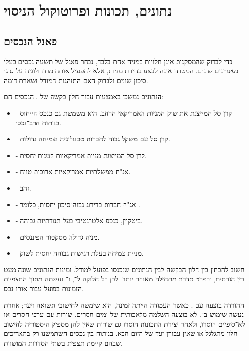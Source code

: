 \section{נתונים, תכונות ופרוטוקול הניסוי}

\subsection{פאנל הנכסים}

כדי לבדוק שהמסקנות אינן תלויות במניה אחת בלבד, נבחר פאנל של תשעה נכסים בעלי מאפיינים שונים. המטרה אינה לבצע בחירת מניות, אלא להפעיל אותה מתודולוגיה על סוגי סיכון שונים ולבדוק האם התנהגות המודל נשארת דומה.

הנתונים נמשכו באמצעות  \cite{yfinance} עבור חלון בקשה של . הנכסים הם:

\begin{itemize}
    \item {} - קרן סל המייצגת את שוק המניות האמריקאי הרחב. היא משמשת גם כנכס הייחוס בניתוח הרב־נכסי.
    \item {} - קרן סל עם משקל גבוה לחברות טכנולוגיה וצמיחה גדולות.
    \item {} - קרן סל המייצגת מניות אמריקאיות קטנות יחסית.
    \item {} - אג"ח ממשלתיות אמריקאיות ארוכות טווח.
    \item {} - זהב.
    \item {} - אג"ח חברות בדירוג גבוה־סיכון יחסית, כלומר .
    \item {} - ביטקוין, כנכס אלטרנטיבי בעל תנודתיות גבוהה.
    \item {} - מניה גדולה מסקטור הפיננסים.
    \item {} - מניית צמיחה בעלת רגישות גבוהה יחסית לשוק.
\end{itemize}

חשוב להבחין בין חלון הבקשה לבין הנתונים שנכנסו בפועל למודל. זמינות הנתונים שונה מעט בין הנכסים, ובפרט סדרת  מתחילה מאוחר יותר. לכן כל חלוקה ל־,  ו־ נעשתה מתוך התצפיות הזמינות בפועל עבור אותו נכס.

ההורדה בוצעה עם . כאשר העמודה  הייתה זמינה, היא שימשה לחישובי תשואה ויעד; אחרת נעשה שימוש ב־. לא בוצעה השלמה מלאכותית של ימים חסרים. שורות עם ערכי  חסרים או לא־סופיים הוסרו, ולאחר יצירת התכונות הוסרו גם שורות שאין להן מספיק היסטוריה לחישוב חלון מתגלגל או שאין עבורן יעד של היום הבא. בניתוח בין נכסים השתמשנו רק בתאריכים שבהם קיימת תצפית בשתי הסדרות המושוות.

